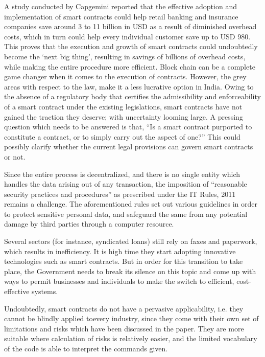 \begin{multicols}{2}
\noi
A study conducted by Capgemini reported that the effective adoption and implementation of
smart contracts could help retail banking and insurance companies save around 3 to 11 billion
in USD as a result of diminished overhead costs, which in turn could help every individual
customer save up to USD 980. This proves that the execution and growth of smart contracts
could undoubtedly become the ‘next big thing’, resulting in savings of billions of overhead
costs, while making the entire procedure more efficient. Block chain can be a complete game
changer when it comes to the execution of contracts. However, the grey areas with respect to
the law, make it a less lucrative option in India. Owing to the absence of a regulatory body
that certifies the admissibility and enforceability of a smart contract under the existing
legislations, smart contracts have not gained the traction they deserve; with uncertainty looming large. A pressing question which needs to be answered is that, “Is a smart contract
purported to constitute a contract, or to simply carry out the aspect of one?” This could
possibly clarify whether the current legal provisions can govern smart contracts or not. 

\noi
Since the entire process is decentralized, and there is no single entity which handles the data
arising out of any transaction, the imposition of “reasonable security practices and
procedures” as prescribed under the IT Rules, 2011 remains a challenge. The aforementioned
rules set out various guidelines in order to protect sensitive personal data, and safeguard the
same from any potential damage by third parties through a computer resource. 

\noi
Several sectors (for instance, syndicated loans) still rely on faxes and paperwork, which
results in inefficiency. It is high time they start adopting innovative technologies such as
smart contracts. But in order for this transition to take place, the Government needs to break
its silence on this topic and come up with ways to permit businesses and individuals to make
the switch to efficient, cost-effective systems.

\newpage

\noi
Undoubtedly, smart contracts do not have a pervasive applicability, i.e. they cannot be
blindly applied to\break every industry, since they come with their own set of limitations and risks
which have been discussed in the paper. They are more suitable where calculation of risks is
relatively easier, and the limited vocabulary of the code is able to interpret the commands
given. 


\end{multicols}
